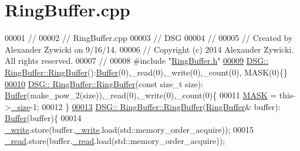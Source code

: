 \hypertarget{_ring_buffer_8cpp_source}{\section{Ring\+Buffer.\+cpp}
\label{_ring_buffer_8cpp_source}
}

\begin{DoxyCode}
00001 \textcolor{comment}{//}
00002 \textcolor{comment}{//  RingBuffer.cpp}
00003 \textcolor{comment}{//  DSG}
00004 \textcolor{comment}{//}
00005 \textcolor{comment}{//  Created by Alexander Zywicki on 9/16/14.}
00006 \textcolor{comment}{//  Copyright (c) 2014 Alexander Zywicki. All rights reserved.}
00007 \textcolor{comment}{//}
00008 \textcolor{preprocessor}{#include "\hyperlink{_ring_buffer_8h}{RingBuffer.h}"}
\hypertarget{_ring_buffer_8cpp_source_l00009}{}\hyperlink{class_d_s_g_1_1_ring_buffer_a3136c9debb3c422adb1d5835e11b2b99}{00009} \hyperlink{class_d_s_g_1_1_ring_buffer_a3136c9debb3c422adb1d5835e11b2b99}{DSG:: RingBuffer::RingBuffer}():\hyperlink{class_d_s_g_1_1_buffer}{Buffer}(0),\_read(0),\_write(0),\_count(0),
      MASK(0)\{\}
\hypertarget{_ring_buffer_8cpp_source_l00010}{}\hyperlink{class_d_s_g_1_1_ring_buffer_ae9859fd3ad18961de494d8b50fe4763e}{00010} \hyperlink{class_d_s_g_1_1_ring_buffer_a3136c9debb3c422adb1d5835e11b2b99}{DSG:: RingBuffer::RingBuffer}(\textcolor{keyword}{const} \textcolor{keywordtype}{size\_t} size):
      \hyperlink{class_d_s_g_1_1_buffer}{Buffer}(make\_pow\_2(size)),\_read(0),\_write(0),\_count(0)\{
00011     \hyperlink{class_d_s_g_1_1_ring_buffer_a2fba2ff6ee3886101f0f58b0fd7f3641}{MASK} = this->\hyperlink{class_d_s_g_1_1_buffer_a4e2fef9ed617af2554b25c999def8f71}{\_size}-1;
00012 \}
\hypertarget{_ring_buffer_8cpp_source_l00013}{}\hyperlink{class_d_s_g_1_1_ring_buffer_ab09f32dacee49df3281c6701b7a4d737}{00013} \hyperlink{class_d_s_g_1_1_ring_buffer_a3136c9debb3c422adb1d5835e11b2b99}{DSG:: RingBuffer::RingBuffer}(\hyperlink{class_d_s_g_1_1_ring_buffer}{RingBuffer}& buffer):
      \hyperlink{class_d_s_g_1_1_buffer}{Buffer}(buffer)\{
00014     \hyperlink{class_d_s_g_1_1_ring_buffer_a78bd7704fd059b745bc82421e1062123}{\_write}.store(buffer.\hyperlink{class_d_s_g_1_1_ring_buffer_a78bd7704fd059b745bc82421e1062123}{\_write}.load(std::memory\_order\_acquire));
00015     \hyperlink{class_d_s_g_1_1_ring_buffer_aa71bb75a5d24700be795a30e1a135a54}{\_read}.store(buffer.\hyperlink{class_d_s_g_1_1_ring_buffer_aa71bb75a5d24700be795a30e1a135a54}{\_read}.load(std::memory\_order\_acquire));

\end{DoxyCode}
